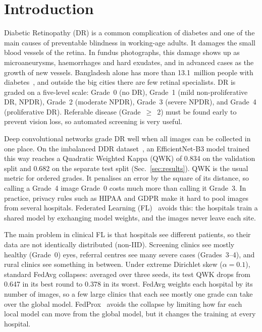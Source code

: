 \section{Introduction}

Diabetic Retinopathy (DR) is a common complication of diabetes and one of the main
causes of preventable blindness in working-age adults. It damages the small blood
vessels of the retina. In fundus photographs, this damage shows up as
microaneurysms, haemorrhages and hard exudates, and in advanced cases as the growth
of new vessels. Bangladesh alone has more than 13.1~million people with
diabetes~\cite{idf2021}, and outside the big cities there are few retinal
specialists. DR is graded on a five-level scale: Grade~0 (no DR), Grade~1 (mild
non-proliferative DR, NPDR), Grade~2 (moderate NPDR), Grade~3 (severe NPDR), and
Grade~4 (proliferative DR). Referable disease (Grade~$\geq$~2) must be found early
to prevent vision loss, so automated screening is very useful.

Deep convolutional networks grade DR well when all images can be collected in one
place. On the imbalanced DDR dataset~\cite{li2019ddr}, an EfficientNet-B3 model
trained this way reaches a Quadratic Weighted Kappa (QWK) of 0.834 on the
validation split and 0.682 on the separate test split (Sec.~\ref{sec:results}).
QWK is the usual metric for ordered grades. It penalises an error by the square of
its distance, so calling a Grade~4 image Grade~0 costs much more than calling it
Grade~3. In practice, privacy rules such as HIPAA and GDPR make it hard to pool
images from several hospitals. Federated Learning (FL)~\cite{mcmahan2017fedavg}
avoids this: the hospitals train a shared model by exchanging model weights, and
the images never leave each site.

The main problem in clinical FL is that hospitals see different patients, so their
data are not identically distributed (non-IID). Screening clinics see mostly
healthy (Grade~0) eyes, referral centres see many severe cases (Grades~3--4), and
rural clinics see something in between. Under extreme Dirichlet skew
($\alpha=0.1$), standard FedAvg collapses: averaged over three seeds, its test QWK
drops from 0.647 in its best round to 0.378 in its worst. FedAvg weights each
hospital by its number of images, so a few large clinics that each see mostly one
grade can take over the global model. FedProx~\cite{li2020fedprox} avoids the
collapse by limiting how far each local model can move from the global model, but
it changes the training at every hospital.

